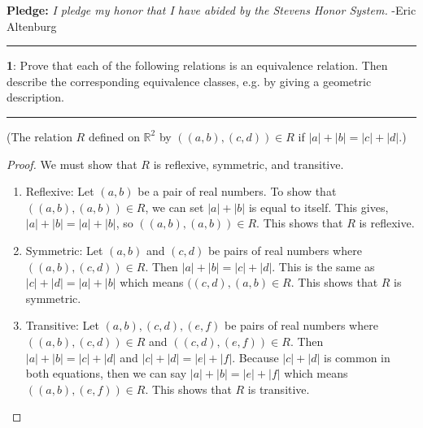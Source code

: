\documentclass[11pt]{article}
\newcommand\question[2]{\vspace{.25in}\hrule\textbf{#1}: #2\vspace{.5em}\hrule\vspace{.10in}}
\renewcommand\part[1]{\vspace{.10in}(#1)\par}
\newcommand{\R}{\mathbb{R}}
\begin{document}
\raggedright
\newcommand\NAME{Eric Altenburg}  %
\newcommand\COURSE{MA-240}
\newcommand\HWNUM{6}              %


\textbf{Pledge:} \textit{I pledge my honor that I have abided by the Stevens Honor System.} -Eric Altenburg

\question{1}{Prove that each of the following relations is an equivalence relation. Then describe the corresponding equivalence classes, e.g. by giving a geometric description.}

\part{The relation $R$ defined on $\R^2$ by $((a,b),(c,d)) \in R$ if $|a| + |b| = |c| + |d|.$}

\begin{proof}
	We must show that $R$ is reflexive, symmetric, and transitive.
	\begin{enumerate}
		\item Reflexive: Let $(a,b)$ be a pair of real numbers. To show that $((a,b),(a,b)) \in R$, we can set $|a|+|b|$ is equal to itself. This gives, $|a|+|b| = |a|+|b|$, so $((a,b),(a,b)) \in R$. This shows that $R$ is reflexive.

		\item Symmetric: Let $(a,b)$ and $(c,d)$ be pairs of real numbers where $((a,b),(c,d)) \in R$. Then $|a|+|b| = |c|+|d|$. This is the same as $|c| + |d| = |a| + |b|$ which means $((c,d),(a,b) \in R$. This shows that $R$ is symmetric. 

		\item Transitive: Let $(a,b),(c,d),(e,f)$ be pairs of real numbers where $((a,b),(c,d)) \in R$ and $((c,d),(e,f)) \in R$. Then $|a|+|b|=|c|+|d|$ and $|c|+|d| = |e| + |f|$. Because $|c|+|d|$ is common in both equations, then we can say $|a| +|b| = |e|+|f|$ which means $((a,b),(e,f)) \in R$. This shows that $R$ is transitive.
	\end{enumerate}
\end{proof}
\end{document}
